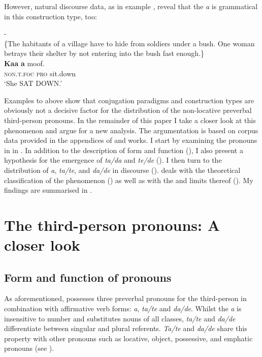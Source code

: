 \documentclass[output=paper,newtxmath,modfonts,nonflat,hidelinks]{langsci/langscibook}
\begin{document}
However, natural discourse data, as in example , reveal that the  \textit{a} is grammatical in this construction type, too:


\ea\label{ex:apel:8}
{- \citep[276]{Faye1979}}\\
{\-\hspace{0cm}\{The habitants of a village have to hide from soldiers under a bush. One woman betrays their shelter by not entering into the bush fast enough.\}}\\
\gll   \textbf{Kaa} \textbf{a} moof.\\
     \textsc{non.t.foc} \textsc{pro} sit.down \\
\glt ‘She SAT DOWN.’
\z

Examples  to  above show that conjugation paradigms and construction types are obviously not a decisive factor for the distribution of the non-locative preverbal third-person  pronouns. In the remainder of this paper I take a closer look at this phenomenon and argue for a new analysis. The argumentation is based on corpus data provided in the appendices of  and  works. I start by examining the  pronouns in  in . In addition to the description of form and function (), I also present a hypothesis for the emergence of \textit{ta/da} and \textit{te/de} (). I then turn to the distribution of \textit{a}, \textit{ta/te}, and \textit{da/de} in discourse ().  deals with the theoretical classification of the phenomenon () as well as with the  and limits thereof (). My findings are summarised in .

\section{The third-person pronouns: A closer look}\label{sec:apel:2}

\subsection{Form and function of pronouns}\label{sec:apel:2.1}

As aforementioned,  possesses three preverbal  pronouns for the third-person in combination with affirmative verb forms: \textit{a}, \textit{ta/te} and \textit{da/de}. Whilst the  \textit{a} is insensitive to number and substitutes nouns of all classes, \textit{ta/te} and \textit{da/de} differentiate between singular and plural referents. \textit{Ta/te} and \textit{da/de} share this property with other  pronouns such as locative, object, possessive, and emphatic pronouns (see ).
\end{document}
